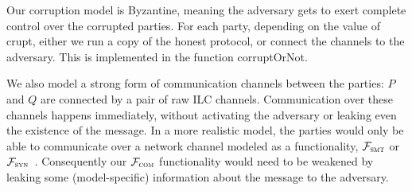 Our corruption model is Byzantine, meaning the adversary gets to exert complete
control over the corrupted parties.
For each party, depending on the value of \textsf{crupt}, either we run a copy
of the honest protocol, or connect the channels to the adversary. This is
implemented in the function \textsf{corruptOrNot}.

%

We also model a strong form of communication channels between the parties: $P$
and $Q$ are connected by a pair of raw ILC channels. Communication over these
channels happens immediately, without activating the adversary or leaking even
the existence of the message.  In a more realistic model, the parties would only
be able to communicate over a network channel modeled as a functionality,
$\mathcal{F}_{\textnormal{\ensuremath{{\mathsf {{\textsc{smt}}}}}}}$ or $\mathcal{F}_{\textnormal{\ensuremath{{\mathsf {{\textsc{syn}}}}}}}$~\cite{canetti2001universally}.
Consequently our $\mathcal{F}_{\textnormal{\ensuremath{{\mathsf {{\textsc{com}}}}}}}$ functionality would need to be weakened by
leaking some (model-specific) information about the message to the adversary.

%


